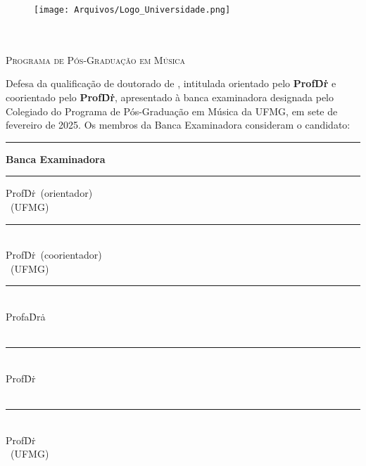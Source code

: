 
\begin{figure}[h]
    \vspace{-2cm}
    \centering  
    \texttt{[image: Arquivos/Logo\_Universidade.png]}\label{fig:pesquisa}
\end{figure}


\begin{center}
    \vspace{0.5cm}
    \textsc{\instituicao}\\
    \textsc{\centro}\\
    \textsc{Programa de Pós-Graduação em Música}
\end{center}
\vspace{1cm}

 \noindent
Defesa da qualificação de doutorado de \textbf{\autor}, intitulada \textbf{\titulo} orientado pelo  \textbf{Prof\. Dr\. \orientador} e coorientado pelo  \textbf{Prof\. Dr\. \coorientador}, apresentado à banca examinadora designada pelo Colegiado do Programa de Pós-Graduação em Música da UFMG, em sete de fevereiro de 2025. Os membros da Banca Examinadora consideram o candidato:
 \rule{3cm}{0.5pt}  






\begin{center}
    \textbf{Banca Examinadora}\\
\vspace{0.8cm}
\rule{8cm}{0.5pt} 
\hfill

Prof\. Dr\. \orientador\ (orientador)\\
\instituicao\ (UFMG)

\vspace{1cm}
\rule{8cm}{0.5pt} \\
Prof\. Dr\. \coorientador\ (coorientador)\\
\instituicao\ (UFMG)
\vspace{1cm} \\
\rule{8cm}{0.5pt} \\
Profa\. Dra\. \membroExterno\  \\
\instituicaoExterno\ 
\vspace{1cm} \\
\rule{8cm}{0.5pt} \\
Prof\. Dr\. \membroExternodois\  \\
\instituicaoExternodois\ 
\vspace{1cm} \\
\rule{8cm}{0.5pt} \\
Prof\. Dr\. \membroInterno\ \\
\instituicao\ (UFMG)




\end{center} 





\vfill




\begin{center}

	\cidade\ \\
     \ano\
\end{center}

\thispagestyle{empty} %

\newpage




